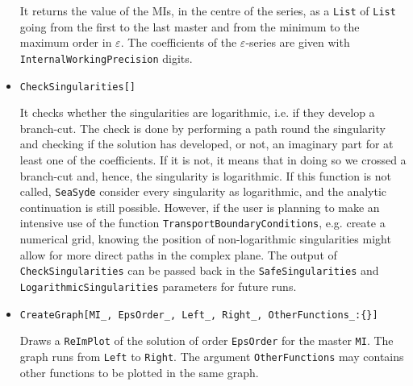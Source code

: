 \documentclass[final,1p,times]{elsarticle}
\begin{document}
\begin{itemize}
    It returns the value of the MIs, in the centre of the series, as a \texttt{List} of \texttt{List} going from the first to the last master and from the minimum to the maximum order in $\varepsilon$. The coefficients of the $\varepsilon$-series are given with \texttt{InternalWorkingPrecision} digits.
    
    \item \texttt{CheckSingularities[]}
    
    It checks whether the singularities are logarithmic, i.e. if they develop a branch-cut. The check is done by performing a path round the singularity and checking if the solution has developed, or not, an imaginary part for at least one of the coefficients. If it is not, it means that in doing so we crossed a branch-cut and, hence, the singularity is logarithmic. If this function is not called, \texttt{SeaSyde} consider every singularity as logarithmic, and the analytic continuation is still possible. However, if the user is planning to make an intensive use of the function \texttt{TransportBoundaryConditions}, e.g. create a numerical grid, knowing the position of non-logarithmic singularities might allow for more direct paths in the complex plane. The output of \texttt{CheckSingularities} can be passed back in the \texttt{SafeSingularities} and \texttt{LogarithmicSingularities} parameters for future runs.
    
    
    
    
    
    
    \item {\texttt{CreateGraph[MI\_, EpsOrder\_, Left\_, Right\_, OtherFunctions\_:\{\}]}}
    
    Draws a \texttt{ReImPlot} of the solution of order \texttt{EpsOrder} for the master \texttt{MI}. The graph runs from \texttt{Left} to \texttt{Right}. 
    The argument \texttt{OtherFunctions} may contains other functions to be plotted in the same graph.
\end{itemize}
\end{document}
